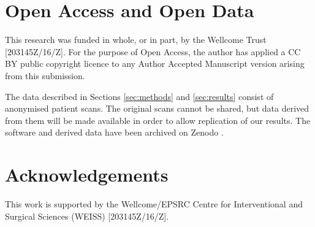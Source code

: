 \section{Open Access and Open Data}
This research was funded in whole, or in part, by the Wellcome Trust [203145Z/16/Z]. 
For the purpose of Open Access, the author has applied a CC BY public copyright licence to any Author Accepted Manuscript version arising from this submission.

The data described in Sections \ref{sec:methods} and \ref{sec:results} consist 
of anonymised patient scans. The original scans cannot be shared, but 
data derived from them will be made available in order to allow replication 
of our results. The software and derived data have been archived on Zenodo \cite{olafsdottir2022}.

\section{Acknowledgements}
This work is supported by the Wellcome/EPSRC Centre for Interventional and Surgical Sciences (WEISS) [203145Z/16/Z].


